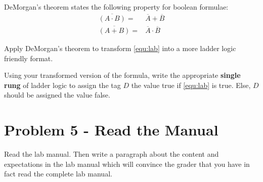 DeMorgan's theorem states the following property for boolean formulae:
\begin{align}
\overline{(A\cdot B)} =& \overline A + \overline B \\
\overline{(A + B)} =& \overline A\cdot \overline B
\end{align}

Apply DeMorgan's theorem to transform \equationautorefname \ref{equ:lab} into a more ladder logic friendly format. 

Using your transformed version of the formula, write the appropriate \textbf{single rung} of ladder logic to assign the tag $D$ the value true if \equationautorefname \ref{equ:lab} is true. Else, $D$ should be assigned the value false.


\section{Problem 5 - Read the Manual}

Read the lab manual. Then write a paragraph about the content and expectations in the lab manual which will convince the grader that you have in fact read the complete lab manual.
